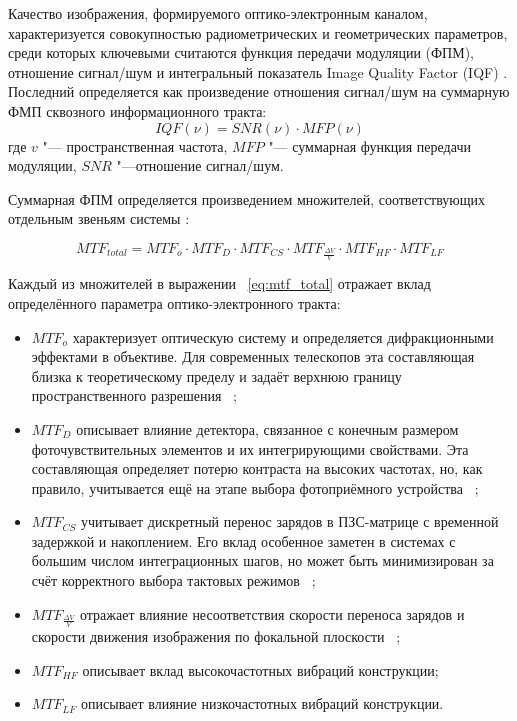 Качество изображения, формируемого оптико-электронным каналом, характеризуется совокупностью радиометрических и геометрических параметров, среди которых ключевыми считаются функция передачи модуляции (ФПМ), отношение сигнал/шум и интегральный показатель Image Quality Factor (IQF) \cite{leachtenauer1997general}. Последний определяется как произведение отношения сигнал/шум на суммарную ФМП сквозного информационного тракта:
\begin{equation}
	\label{eq:eq_IQF}
	 IQF(\nu)=SNR(\nu)\cdot MFP(\nu)
\end{equation}
	где \( v \) "--- пространственная частота, \( MFP \) "--- суммарная функция передачи модуляции, \( SNR \) "---отношение сигнал/шум.
	
	
Суммарная ФПМ определяется произведением множителей, соответствующих отдельным звеньям системы \cite{wahballah2018smear}:

\begin{equation}
	\label{eq:mtf_total}
	MTF_{total}=MTF_o\cdot MTF_D \cdot MTF_{CS} \cdot MTF_{\frac{\Delta V}{V}} \cdot MTF_{HF} \cdot MTF_{LF}
	\end{equation}

Каждый из множителей в выражении ~\eqref{eq:mtf_total} отражает вклад определённого параметра оптико-электронного тракта:

\begin{itemize}
	\item \(MTF_o\) характеризует оптическую систему и определяется дифракционными эффектами в объективе. Для современных телескопов эта составляющая близка к теоретическому пределу и задаёт верхнюю границу пространственного разрешения ~\cite{Abolghasemi2012};
	\item \(MTF_D\) описывает влияние детектора, связанное с конечным размером фоточувствительных элементов и их интегрирующими свойствами. Эта составляющая определяет потерю контраста на высоких частотах, но, как правило, учитывается ещё на этапе выбора фотоприёмного устройства ~\cite{Joseph2015};
	\item \(MTF_{CS}\)  учитывает дискретный перенос зарядов в ПЗС-матрице с временной задержкой и накоплением. Его вклад особенное заметен в системах с большим числом интеграционных шагов, но может быть минимизирован за счёт корректного выбора тактовых режимов ~\cite{Wong1992};
	\item \(MTF_{\frac{\Delta V}{V}}\) отражает влияние несоответствия скорости переноса зарядов и скорости движения изображения по фокальной плоскости ~\cite{Wong1992};
	\item \(MTF_{HF}\) описывает вклад высокочастотных вибраций конструкции;
	\item \(MTF_{LF}\) описывает влияние низкочастотных вибраций конструкции.
\end{itemize}

